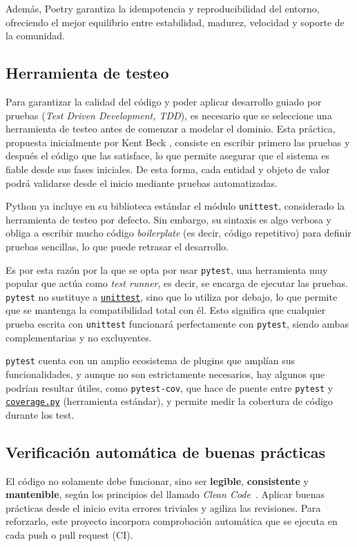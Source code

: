 Además, Poetry garantiza la idempotencia y reproducibilidad del entorno, ofreciendo el mejor equilibrio
entre estabilidad, madurez, velocidad y soporte de la comunidad.

\subsection{Herramienta de testeo} \label{sec:herramienta-testeo}
Para garantizar la calidad del código y poder aplicar desarrollo guiado por pruebas 
(\textit{Test Driven Development, TDD}), es necesario que se seleccione una herramienta de testeo antes de 
comenzar a modelar el dominio. Esta práctica, propuesta inicialmente por Kent Beck \cite{beckTDD}, 
consiste en escribir primero las pruebas y después el código que las satisface, lo que permite asegurar 
que el sistema es fiable desde sus fases iniciales. De esta forma, cada entidad y objeto de valor podrá 
validarse desde el inicio mediante pruebas automatizadas.

Python ya incluye en su biblioteca estándar el módulo \texttt{unittest}, considerado la herramienta
de testeo por defecto. Sin embargo, su sintaxis es algo verbosa y obliga a escribir mucho código
\textit{boilerplate} (es decir, código repetitivo) para definir pruebas sencillas, lo que puede 
retrasar el desarrollo.

Es por esta razón por la que se opta por usar \texttt{pytest}, una herramienta muy popular que actúa 
como \textit{test runner}, es decir, se encarga de ejecutar las pruebas. \texttt{pytest} no sustituye 
a \texttt{\href{https://docs.python.org/es/3/library/unittest.html}{unittest}}, sino que lo utiliza por 
debajo, lo que permite que se mantenga la compatibilidad total con él. Esto significa que cualquier 
prueba escrita con \texttt{unittest} funcionará perfectamente con \texttt{pytest}, siendo ambas 
complementarias y no excluyentes.

\texttt{pytest} cuenta con un amplio ecosistema de plugins que amplían sus funcionalidades, y aunque no son
estrictamente necesarios, hay algunos que podrían resultar útiles, como \texttt{pytest-cov}, que hace
de puente entre \texttt{pytest} y \texttt{\href{https://coverage.readthedocs.io/en/7.10.6/}{coverage.py}}
(herramienta estándar), y permite medir la cobertura de código durante los test.

\subsection{Verificación automática de buenas prácticas}
El código no solamente debe funcionar, sino ser \textbf{legible}, \textbf{consistente} y \textbf{mantenible},
según los principios del llamado \emph{Clean Code}~\cite{martin2009cleancode}.
Aplicar buenas prácticas desde el inicio evita errores triviales y agiliza las revisiones. Para reforzarlo,
este proyecto incorpora comprobación automática que se ejecuta en cada push o pull request (CI).

